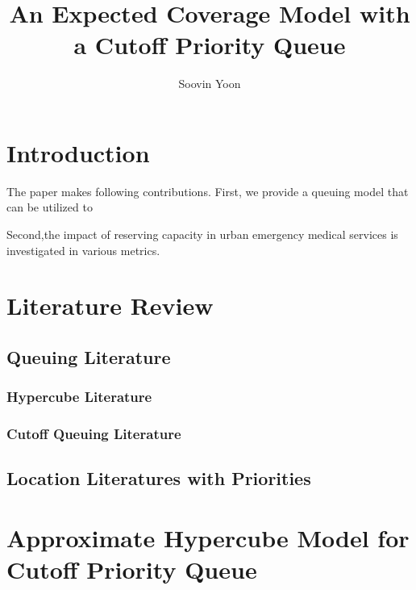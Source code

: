 \documentclass{article}
\title{An Expected Coverage Model with a Cutoff Priority Queue}
\author{Soovin Yoon}
\begin{document}
\maketitle





\section{Introduction}

The paper makes following contributions. First, we provide a queuing model that can be utilized to

Second,the impact of reserving capacity in urban emergency medical services is investigated in various metrics. 

\section{Literature Review}
\subsection{Queuing Literature}
\subsubsection{Hypercube Literature}
\subsubsection{Cutoff Queuing Literature}
\subsection{Location Literatures with Priorities}



\section{Approximate Hypercube Model for Cutoff Priority Queue}

\end{document}
